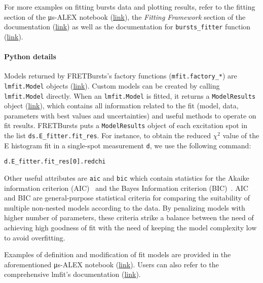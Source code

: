 For more examples on fitting bursts data and plotting results, refer to the
fitting section of the μs-ALEX notebook (\href{http://nbviewer.jupyter.org/github/tritemio/FRETBursts_notebooks/blob/master/notebooks/FRETBursts%20-%20us-ALEX%20smFRET%20burst%20analysis.ipynb#FRET-fit:-in-depth-example}{link}),
the \textit{Fitting Framework} section of the documentation
(\href{http://fretbursts.readthedocs.org/en/latest/fit.html}{link})
as well as the documentation for \verb|bursts_fitter| function
(\href{http://fretbursts.readthedocs.org/en/latest/plugins.html#fretbursts.burstlib_ext.bursts_fitter}{link}).

\paragraph{Python details}

Models returned by FRETBursts's factory functions (\verb|mfit.factory_*|)
are \verb|lmfit.Model| objects (\href{https://lmfit.github.io/lmfit-py/model.html}{link}).
Custom models can be created by calling \verb|lmfit.Model| directly.
When an \verb|lmfit.Model| is fitted, it returns a \verb|ModelResults| object
(\href{https://lmfit.github.io/lmfit-py/model.html#the-modelresult-class}{link}),
which contains all information related to the fit (model, data,
parameters with best values and uncertainties) and useful methods to operate on fit results.
FRETBursts puts a \verb|ModelResults| object of each excitation spot in the list
\verb|ds.E_fitter.fit_res|.
For instance, to obtain the reduced $\chi^2$ value of the E histogram fit in a
single-spot measurement \verb|d|, we use the following command:

\begin{lstlisting}
d.E_fitter.fit_res[0].redchi
\end{lstlisting}

Other useful attributes are \verb|aic| and \verb|bic| which contain
statistics for the Akaike information criterion (AIC)~\cite{akaike_new_1974} 
and the Bayes Information criterion (BIC)~\cite{schwarz_estimating_1978}.
AIC and BIC are general-purpose statistical criteria for comparing the
suitability of multiple non-nested models according to the data.
By penalizing models with higher number of parameters, these criteria 
strike a balance between the need of achieving high goodness of fit 
with the need of keeping the model complexity low to avoid overfitting.

Examples of definition and modification of fit models are provided in
the aforementioned μs-ALEX notebook
(\href{http://nbviewer.jupyter.org/github/tritemio/FRETBursts_notebooks/blob/master/notebooks/FRETBursts%20-%20us-ALEX%20smFRET%20burst%20analysis.ipynb#FRET-fit:-in-depth-example}{link}).
Users can also refer to the comprehensive lmfit's documentation
(\href{http://lmfit.github.io/lmfit-py/}{link}).

